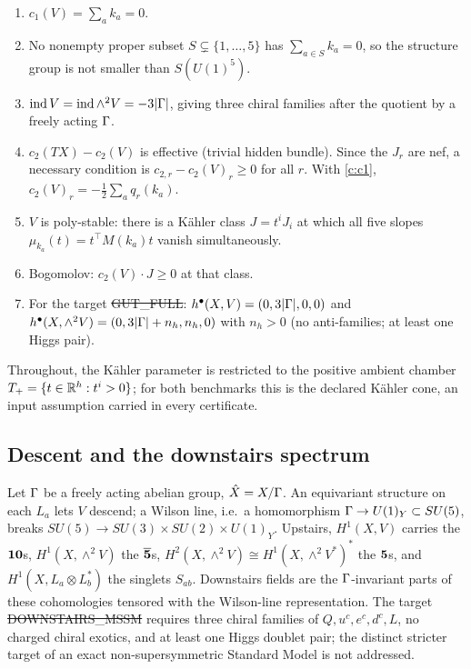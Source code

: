 \begin{enumerate}[label=(C\arabic*),leftmargin=*]
\item\label{c:c1} $c_1(V)=\sum_a k_a=0$.
\item\label{c:structure} No nonempty proper subset $S\subsetneq\{1,\dots,5\}$ has
  $\sum_{a\in S}k_a=0$, so the structure group is not smaller than $S(U(1)^5)$.
\item\label{c:index} $\operatorname{ind} V=\operatorname{ind}\wedge^2V=-3|\Gamma|$, giving three chiral
  families after the quotient by a freely acting $\Gamma$.
\item\label{c:anomaly} $c_2(TX)-c_2(V)$ is effective (trivial hidden bundle).
  Since the $J_r$ are nef, a necessary condition is
  $c_{2,r}-c_2(V)_r\ge0$ for all $r$. With \ref{c:c1},
  $c_2(V)_r=-\tfrac12\sum_a q_r(k_a)$.
\item\label{c:slope} $V$ is poly-stable: there is a Kähler class $J=t^iJ_i$ at
  which all five slopes $\mu_{k_a}(t)=t^\top M(k_a)t$ vanish simultaneously.
\item\label{c:bogomolov} Bogomolov: $c_2(V)\cdot J\ge 0$ at that class.
\item\label{c:spectrum} For the target \st{GUT\_FULL}: $h^\bullet(X,V)=(0,3|\Gamma|,0,0)$
  and $h^\bullet(X,\wedge^2V)=(0,3|\Gamma|+n_h,n_h,0)$ with $n_h>0$ (no
  anti-families; at least one Higgs pair).
\end{enumerate}

Throughout, the Kähler parameter is restricted to the positive ambient chamber
$T_+=\{t\in\mathbb{R}^h:t^i>0\}$; for both benchmarks this is the declared Kähler cone,
an input assumption carried in every certificate.

\subsection{Descent and the downstairs spectrum}

Let $\Gamma$ be a freely acting abelian group, $\hat X=X/\Gamma$. An equivariant
structure on each $L_a$ lets $V$ descend; a Wilson line, i.e.\ a homomorphism
$\Gamma\to U(1)_Y\subset SU(5)$, breaks $SU(5)\to SU(3)\times SU(2)\times U(1)_Y$.
Upstairs, $H^1(X,V)$ carries the $\mathbf{10}$s, $H^1(X,\wedge^2V)$ the $\overline{\mathbf{5}}$s,
$H^2(X,\wedge^2V)\cong H^1(X,\wedge^2V^*)^*$ the $\mathbf{5}$s, and
$H^1(X,L_a\otimes L_b^*)$ the singlets $S_{ab}$. Downstairs fields are the
$\Gamma$-invariant parts of these cohomologies tensored with the Wilson-line
representation. The target \st{DOWNSTAIRS\_MSSM} requires three chiral families
of $Q,u^c,e^c,d^c,L$, no charged chiral exotics, and at least one Higgs doublet
pair; the distinct stricter target of an exact non-supersymmetric Standard Model
is not addressed.

